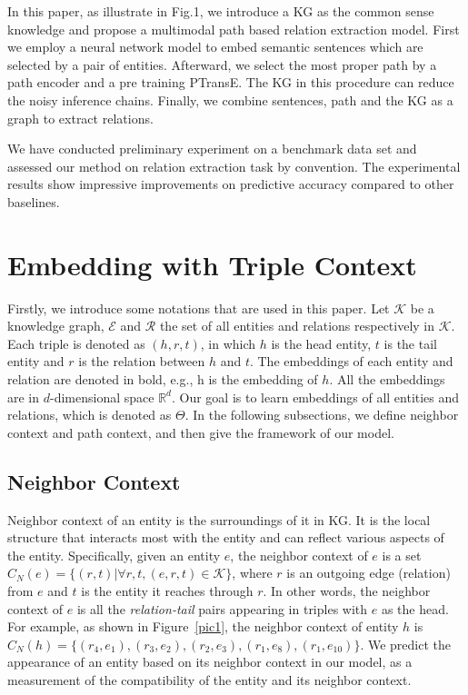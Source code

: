 In this paper, as illustrate in Fig.1, we introduce a KG as the common sense knowledge and propose a multimodal path based relation extraction model. First we employ a neural network model to embed semantic sentences which are selected by a pair of entities. Afterward, we select the most proper path by a path encoder and a pre training PTransE. The KG in this procedure can reduce the noisy inference chains. Finally, we combine sentences, path and the KG as a graph to extract relations.  

We have conducted preliminary experiment on a benchmark data set and assessed our method on relation extraction task by convention. The experimental results show impressive improvements on predictive accuracy compared to other baselines.

\section{Embedding with Triple Context}
Firstly, we introduce some notations that are used in this paper. Let $\mathcal{K}$ be a knowledge graph, $\mathcal{E}$ and $\mathcal{R}$ the set of all entities and relations respectively in $\mathcal{K}$. Each triple is denoted as $(h, r, t)$, in which $h$ is the head entity, $t$ is the tail entity and $r$ is the relation between $h$ and $t$. The embeddings of each entity and relation are denoted in bold, e.g., $\bm{\mathrm{h}}$ is the embedding of $h$. All the embeddings are in $d$-dimensional space $\mathbb{R}^d$. Our goal is to learn embeddings of all entities and relations, which is denoted as $\Theta$. In the following subsections, we define neighbor context and path context, and then give the framework of our model.

\subsection{Neighbor Context}
Neighbor context of an entity is the surroundings of it in KG. It is the local structure that interacts most with the entity and can reflect various aspects of the entity. Specifically, given an entity $e$, the neighbor context of $e$ is a set $C_N(e)=\{(r,t)|\forall r, t, (e,r,t)\in\mathcal{K}\}$, where $r$ is an outgoing edge (relation) from $e$ and $t$ is the entity it reaches through $r$. In other words, the neighbor context of $e$ is all the \textit{relation-tail} pairs appearing in triples with $e$ as the head. For example, as shown in Figure~\ref{pic1}, the neighbor context of entity $h$ is $C_N(h)=\{(r_4, e_1), (r_3, e_2), (r_2, e_3), (r_1, e_8), (r_1, e_{10})\}$. We predict the appearance of an entity based on its neighbor context in our model, as a measurement of the compatibility of the entity and its neighbor context.

